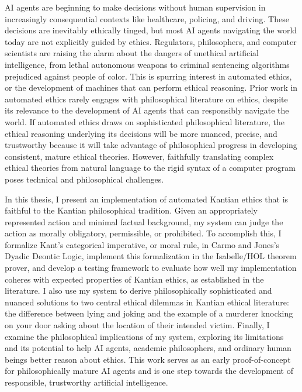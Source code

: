 %
\begin{isabellebody}%
%
%
\isadelimtheory
%
\endisadelimtheory
%
\isatagtheory
%
\endisatagtheory
{\isafoldtheory}%
%
\isadelimtheory
%
\endisadelimtheory
%
\begin{isamarkuptext}%
AI agents are beginning to make decisions without human supervision in increasingly consequential 
contexts like healthcare, policing, and driving. These decisions are inevitably ethically tinged, 
but most AI agents navigating the world today are not explicitly guided by ethics.
Regulators, philosophers, and computer scientists are raising the alarm about the 
dangers of unethical artificial intelligence, from lethal autonomous weapons to criminal
sentencing algorithms prejudiced against people of color. This is spurring interest in automated ethics, or the development 
of machines that can perform ethical reasoning. Prior work in automated ethics rarely engages with
philosophical literature on ethics, despite its relevance to the development of AI agents that can
responsibly navigate the world. If automated ethics draws on sophisticated philosophical literature, the ethical reasoning
underlying its decisions will be more nuanced, precise, and trustworthy because it will
take advantage of philosophical progress in developing consistent, mature ethical theories. However, 
faithfully translating complex ethical theories from natural language to the rigid syntax of a computer
program poses technical and philosophical challenges. 

In this thesis, I present an implementation of automated Kantian
ethics that is faithful to the Kantian philosophical tradition. Given an appropriately represented 
action and minimal factual background, my system can judge the action as morally obligatory, permissible, or prohibited.
To accomplish this, I formalize Kant's categorical imperative, or moral rule,
in Carmo and Jones's Dyadic Deontic Logic, implement this formalization 
in the Isabelle/HOL theorem prover, and develop a testing framework to evaluate how well 
my implementation coheres with expected properties of Kantian ethics, as established in the literature. 
I also use my system to derive philosophically sophisticated and nuanced solutions to two central ethical 
dilemmas in Kantian ethical literature: the difference
between lying and joking and the example of a murderer knocking on your door asking about the location of their
intended victim. Finally, I examine the philosophical implications of my system, exploring its limitations 
and its potential to help AI agents, academic philosophers, and ordinary human beings better reason about ethics. This work serves 
as an early proof-of-concept for philosophically mature AI agents and is one step towards the development 
of responsible, trustworthy artificial intelligence.%
\end{isamarkuptext}\isamarkuptrue%
%
\isadelimtheory
%
\endisadelimtheory
%
\isatagtheory
%
\endisatagtheory
{\isafoldtheory}%
%
\isadelimtheory
%
\endisadelimtheory
%
\end{isabellebody}%
